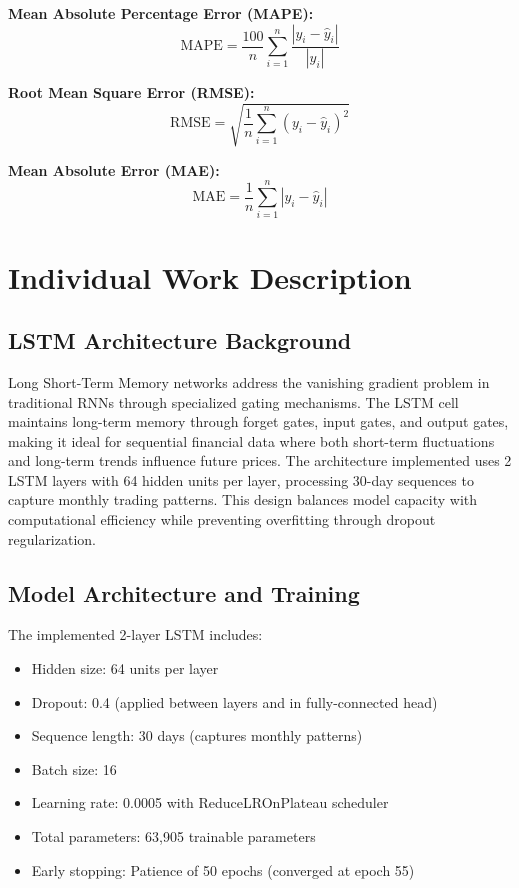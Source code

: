 \documentclass[12pt,letterpaper]{article}
\begin{document}
\textbf{Mean Absolute Percentage Error (MAPE):}
\begin{equation}
\text{MAPE} = \frac{100}{n} \sum_{i=1}^{n} \frac{|y_i - \hat{y}_i|}{|y_i|}
\end{equation}

\textbf{Root Mean Square Error (RMSE):}
\begin{equation}
\text{RMSE} = \sqrt{\frac{1}{n} \sum_{i=1}^{n} (y_i - \hat{y}_i)^2}
\end{equation}

\textbf{Mean Absolute Error (MAE):}
\begin{equation}
\text{MAE} = \frac{1}{n} \sum_{i=1}^{n} |y_i - \hat{y}_i|
\end{equation}

\section{Individual Work Description}

\subsection{LSTM Architecture Background}

Long Short-Term Memory networks address the vanishing gradient problem in traditional RNNs through specialized gating mechanisms. The LSTM cell maintains long-term memory through forget gates, input gates, and output gates, making it ideal for sequential financial data where both short-term fluctuations and long-term trends influence future prices. The architecture implemented uses 2 LSTM layers with 64 hidden units per layer, processing 30-day sequences to capture monthly trading patterns. This design balances model capacity with computational efficiency while preventing overfitting through dropout regularization.

\subsection{Model Architecture and Training}

The implemented 2-layer LSTM includes:

\begin{itemize}[noitemsep]
    \item Hidden size: 64 units per layer
    \item Dropout: 0.4 (applied between layers and in fully-connected head)
    \item Sequence length: 30 days (captures monthly patterns)
    \item Batch size: 16
    \item Learning rate: 0.0005 with ReduceLROnPlateau scheduler
    \item Total parameters: 63,905 trainable parameters
    \item Early stopping: Patience of 50 epochs (converged at epoch 55)
\end{itemize}
\end{document}

